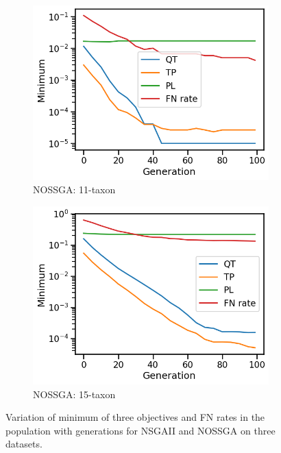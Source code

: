 \begin{figure}[!htbp]
\begin{adjustwidth}{-1cm}{-1cm}
\begin{subfigure}[b]{0.4\textwidth}
			\includegraphics[width=\textwidth]{Figure/11-taxon_NOSSGA_minimum}
			\caption{NOSSGA: 11-taxon}
		\end{subfigure}%
		\begin{subfigure}[b]{0.4\textwidth}
			\includegraphics[width=\textwidth]{Figure/15-taxon_NOSSGA_minimum}
			\caption{NOSSGA: 15-taxon}
		\end{subfigure}
		\caption{Variation of minimum of three objectives and FN rates in the population with generations for NSGAII and NOSSGA on three datasets.
		}
		\label{fig:gen_wise_min}
	\end{adjustwidth}
\end{figure}

